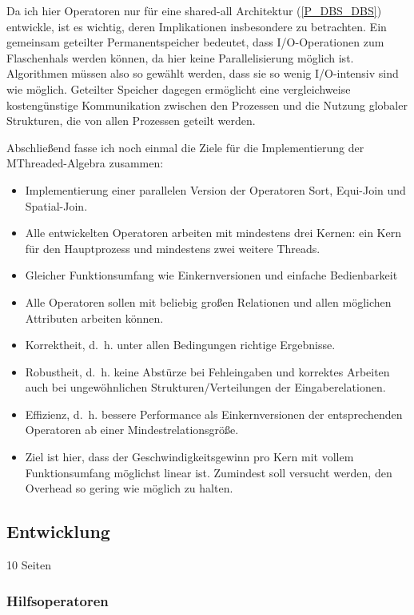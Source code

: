 \documentclass[a4paper,12pt,twoside]{article}
\begin{document}
Da ich hier Operatoren nur für eine shared-all Architektur (\autoref{P_DBS_DBS}) entwickle, ist es wichtig, deren Implikationen insbesondere zu betrachten. Ein gemeinsam geteilter Permanentspeicher bedeutet, dass I/O-Operationen zum Flaschenhals werden können, da hier keine Parallelisierung möglich ist. Algorithmen müssen also so gewählt werden, dass sie so wenig I/O-intensiv sind wie möglich. Geteilter Speicher dagegen ermöglicht eine vergleichweise kostengünstige Kommunikation zwischen den Prozessen und die Nutzung globaler Strukturen, die von allen Prozessen geteilt werden.

Abschließend fasse ich noch einmal die Ziele für die Implementierung der MThreaded-Algebra zusammen:

\begin{itemize}
	\item Implementierung einer parallelen Version der Operatoren Sort, Equi-Join und Spatial-Join.
	\item Alle entwickelten Operatoren arbeiten mit mindestens drei Kernen: ein Kern für den Hauptprozess und mindestens zwei weitere Threads.
	\item Gleicher Funktionsumfang wie Einkernversionen und einfache Bedienbarkeit
	\item Alle Operatoren sollen mit beliebig großen Relationen und allen möglichen Attributen arbeiten können.  
	\item Korrektheit, d.~h. unter allen Bedingungen richtige Ergebnisse.
	\item Robustheit, d.~h. keine Abstürze bei Fehleingaben und korrektes Arbeiten auch bei ungewöhnlichen Strukturen/Verteilungen der Eingaberelationen.
	\item Effizienz, d.~h. bessere Performance als Einkernversionen der entsprechenden Operatoren ab einer Mindestrelationsgröße.
	\item Ziel ist hier, dass der Geschwindigkeitsgewinn pro Kern mit vollem Funktionsumfang möglichst linear ist. Zumindest soll versucht werden, den Overhead so gering wie möglich zu halten.
\end{itemize}

\subsection{Entwicklung} 10 Seiten
\label{Entwicklung} 

\subsubsection{Hilfsoperatoren}
\end{document}
